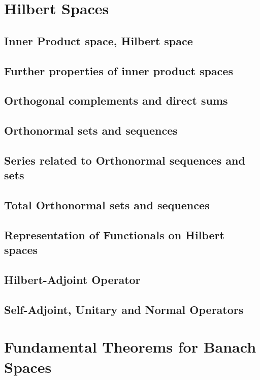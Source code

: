\section{Hilbert Spaces}
\subsection{Inner Product space, Hilbert space}
\subsection{Further properties of inner product spaces}
\subsection{Orthogonal complements and direct sums}
\subsection{Orthonormal sets and sequences}
\subsection{Series related to Orthonormal sequences and sets}
\subsection{Total Orthonormal sets and sequences}
\setcounter{subsection}{7}
\subsection{Representation of Functionals on Hilbert spaces}
\subsection{Hilbert-Adjoint Operator}
\subsection{Self-Adjoint, Unitary and Normal Operators}

\section{Fundamental Theorems for Banach Spaces}
